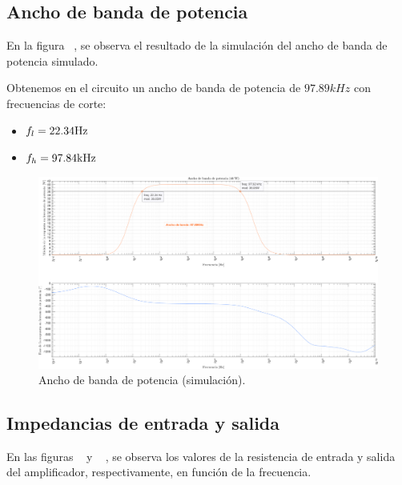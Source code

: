 \subsection{Ancho de banda de potencia}

\par En la figura ~, se observa el resultado de la simulación del ancho de banda de potencia simulado.
\par Obtenemos en el circuito un ancho de banda de potencia de $97.89kHz$ con frecuencias de corte:

\begin{itemize}
    \item $f_l = 22.34 \si[per-mode=symbol]{\hertz}$
    \item $f_h = 97.84 \si[per-mode=symbol]{\kilo\hertz}$
\end{itemize}

\vfill

\clearpage

\begin{figure}[H]
    \centering
    \includegraphics[height=0.66 \textwidth, angle=90]{./img/simulaciones/BW/Power_BW.png}
    \caption{Ancho de banda de potencia (simulación).}
    \label{fig:Power_BW_sim}
\end{figure}

\clearpage

\subsection{Impedancias de entrada y salida}

\par En las figuras ~ y ~ , se observa los valores de la resistencia de entrada y salida del amplificador, respectivamente, en función de la frecuencia.

